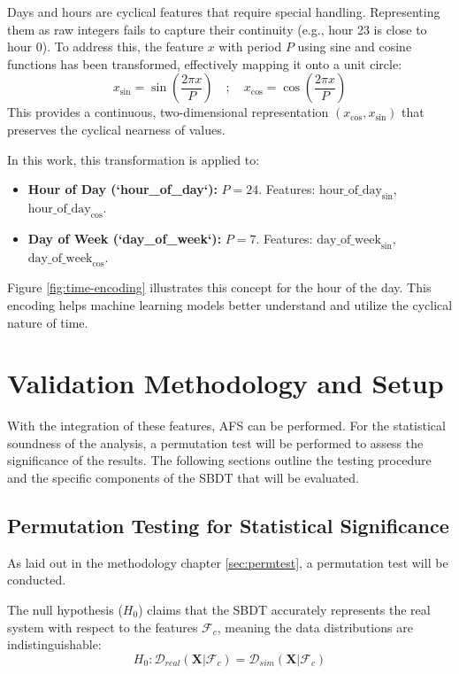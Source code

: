 Days and hours are cyclical features that require special handling. Representing them as raw integers fails to capture their continuity (e.g., hour 23 is close to hour 0). To address this, the feature $x$ with period $P$ using sine and cosine functions has been transformed, effectively mapping it onto a unit circle:
\begin{equation}
  x_{\sin} = \sin\left(\frac{2 \pi x}{P}\right) \quad ; \quad
  x_{\cos} = \cos\left(\frac{2 \pi x}{P}\right)
  \label{eq:sincos_transform}
\end{equation}
This provides a continuous, two-dimensional representation $(x_{\cos}, x_{\sin})$ that preserves the cyclical nearness of values.

In this work, this transformation is applied to:

\begin{itemize}
  \item \textbf{Hour of Day (`hour\_of\_day`):} $P=24$. Features: $\text{hour\_of\_day}_{\sin}$, $\text{hour\_of\_day}_{\cos}$.
  \item \textbf{Day of Week (`day\_of\_week`):} $P=7$. Features: $\text{day\_of\_week}_{\sin}$, $\text{day\_of\_week}_{\cos}$.
\end{itemize}

Figure \ref{fig:time-encoding} illustrates this concept for the hour of the day. This encoding helps machine learning models better understand and utilize the cyclical nature of time.

\section{Validation Methodology and Setup}
With the integration of these features, AFS can be performed. For the statistical soundness of the analysis, a permutation test will be performed to assess the significance of the results. The following sections outline the testing procedure and the specific components of the SBDT that will be evaluated.

\subsection*{Permutation Testing for Statistical Significance}
\label{sec:model-logic}

As laid out in the methodology chapter \autoref{sec:permtest}, a permutation test will be conducted.

\noindent The null hypothesis ($H_0$) claims that the SBDT accurately represents the real system with respect to the features $\mathcal{F}_c$, meaning the data distributions are indistinguishable:
\begin{equation}
  H_0: \mathcal{D}_{real}(\mathbf{X} | \mathcal{F}_c) = \mathcal{D}_{sim}(\mathbf{X} | \mathcal{F}_c)
  \label{eq:h0}
\end{equation}

